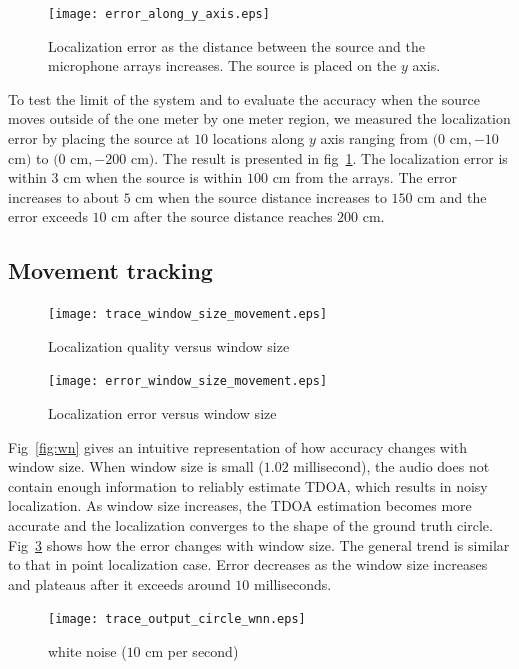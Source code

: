 \begin{figure}[h!]
\centering
\texttt{[image: error\_along\_y\_axis.eps]}
\caption{Localization error as the distance between the source and the microphone arrays increases. The source is placed on the $y$ axis.}
\label{fig:error_along_y}
\end{figure}
To test the limit of the system and to evaluate the accuracy when the source moves outside of the one meter by one meter region, we measured the localization error by placing the source at $10$ locations along $y$ axis ranging from $(0$ cm$, -10$ cm$)$ to $(0$ cm$, -200$ cm$)$. The result is presented in fig~\ref{fig:error_along_y}. The localization error is within $3$ cm when the source is within $100$ cm from the arrays. The error increases to about $5$ cm when the source distance increases to $150$ cm and the error exceeds $10$ cm after the source distance reaches $200$ cm.

\clearpage
\subsection{Movement tracking}
\begin{figure}[h!]
\centering
  \texttt{[image: trace\_window\_size\_movement.eps]}
\caption{Localization quality versus window size}\label{fig:wn}
\label{fig:trace_win_circle}
\end{figure}

\begin{figure}[h!]
\centering
\texttt{[image: error\_window\_size\_movement.eps]}
\caption{Localization error versus window size}
\label{fig:err_win_circle}
\end{figure}
Fig~\ref{fig:wn} gives an intuitive representation of how accuracy changes with window size. When window size is small ($1.02$ millisecond), the audio does not contain enough information to reliably estimate TDOA, which results in noisy localization. As window size increases, the TDOA estimation becomes more accurate and the localization converges to the shape of the ground truth circle. Fig~\ref{fig:err_win_circle} shows how the error changes with window size. The general trend is similar to that in point localization case. Error decreases as the window size increases and plateaus after it exceeds around $10$ milliseconds.

\begin{figure}[h!]
\centering
\texttt{[image: trace\_output\_circle\_wnn.eps]}
\caption{white noise ($10$ cm per second)}
\label{fig:circle_wnn}
\end{figure}


